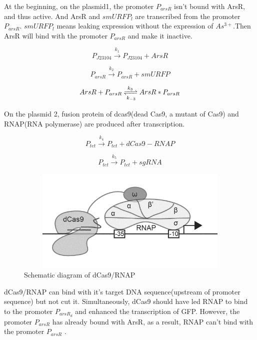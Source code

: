 At the beginning, on the plasmid1, the promoter $P_{arsR}$ isn't bound with ArsR, and thus active. And ArsR and $smURFP_l$ are transcribed from the promoter $P_{arsR}$. $smURFP_l$ means leaking expression without the expression of $As^{3+}$.Then ArsR will bind with the promoter $P_{arsR}$ and make it inactive. 

\begin{equation}
P_{J23104} \stackrel{k_1}{\longrightarrow} P_{J23104}+ArsR
\end{equation}

\begin{equation}
P_{arsR} \stackrel{k_2}{\longrightarrow} P_{arsR} +smURFP
\end{equation}

\begin{equation}
ArsR+P_{arsR} \xrightleftharpoons[k_{-3}]{k_3}ArsR*P_{arsR} 
\end{equation} 

On the plasmid 2, fusion protein of dcas9(dead Cas9, a mutant of Cas9) and RNAP(RNA polymerase) are produced after transcription.

\begin{equation}
P_{tet} \stackrel{k_{4}}{\longrightarrow} P_{tet} +dCas9-RNAP
\end{equation}

\begin{equation}
P_{tet} \stackrel{k_{5}}{\longrightarrow} P_{tet} +sgRNA
\end{equation}

\begin{figure}[h]
	\centering
	\includegraphics[width=12cm,height=5cm]{2}
	\caption{Schematic diagram of dCas9/RNAP}
\end{figure}

dCas9/RNAP can bind with it's target DNA sequence(upstream of promoter sequence) but not cut it. Simultaneously, dCas9 should have led RNAP to bind to the promoter $P_{arsR_d}$ and enhanced the transcription of GFP. However, the promoter $P_{arsR}$ has already bound with ArsR, as a result, RNAP can't bind with the promoter $P_{arsR}$ . \\ 


